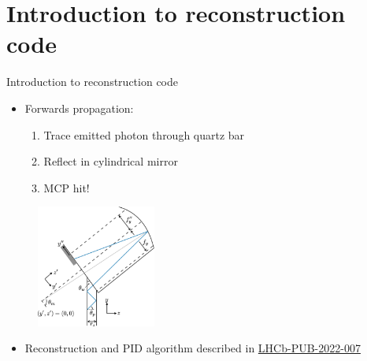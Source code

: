 \documentclass{beamer}
\begin{document}
\section{Introduction to reconstruction code}
\begin{frame}{Introduction to reconstruction code}
  \begin{itemize}
    \item{Forwards propagation:}
    \begin{enumerate}
      \item{Trace emitted photon through quartz bar}
      \item{Reflect in cylindrical mirror}
      \item{MCP hit!}
    \end{enumerate}
  \end{itemize}
  \begin{figure}
    \includegraphics[width = 0.35\textwidth]{Plots/torch-geometry.pdf}
  \end{figure}
  \begin{itemize}
    \item{Reconstruction and PID algorithm described in \href{https://www.overleaf.com/project/5d0b9c5a5005405666aacd05}{LHCb-PUB-2022-007}}
  \end{itemize}
\end{frame}
\end{document}
